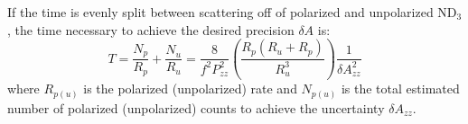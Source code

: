 If the time is evenly split between scattering off of polarized and unpolarized ND$_3$, the time necessary to achieve the desired precision $\delta A$ is:
\begin{equation}
T=\frac{N_p}{R_p}+\frac{N_u}{R_u}=\frac{8}{f^2P_{zz}^2}\left(\frac{R_p(R_u+R_p)}{R_u^3}\right)\frac{1}{\delta A_{zz}^2}
\end{equation} 
where $R_{p(u)}$ is the polarized (unpolarized) rate and $N_{p(u)}$ is the total estimated 
number of polarized (unpolarized) counts to achieve the uncertainty $\delta A_{zz}$.  

